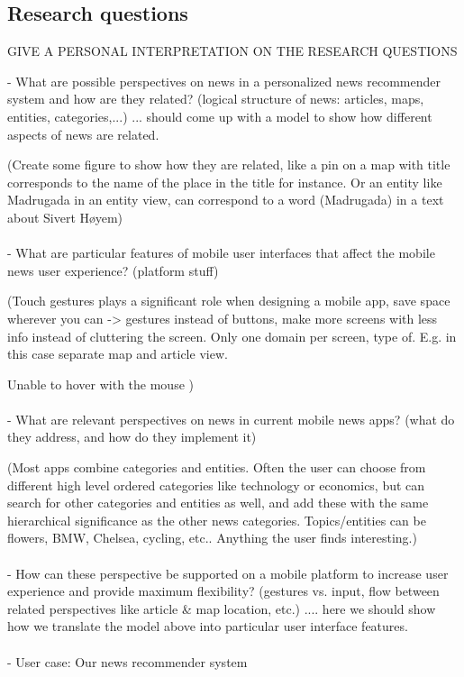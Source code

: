 \subsection{Research questions}

GIVE A PERSONAL INTERPRETATION ON THE RESEARCH QUESTIONS

- What are possible perspectives on news in a personalized news recommender system and how are they related? (logical structure of news: articles, maps, entities, categories,...)  ... should come up with a model to show how different aspects of news are related.

(Create some figure to show how they are related, like a pin on a map with title corresponds to the name of the place in the title for instance. Or an entity like Madrugada in an entity view, can correspond to a word (Madrugada) in a text about Sivert Høyem)
\\\\
- What are particular features of mobile user interfaces that affect the mobile news user experience? (platform stuff)

(Touch gestures plays a significant role when designing a mobile app, save space wherever you can -> gestures instead of buttons, make more screens with less info instead of cluttering the screen. Only one domain per screen, type of. E.g. in this case separate map and article view.

Unable to hover with the mouse
)
\\\\
- What are relevant perspectives on news in current mobile news apps? (what do they address, and how do they implement it)

(Most apps combine categories and entities. Often the user can choose from different high level ordered categories like technology or economics, but can search for other categories and entities as well, and add these with the same hierarchical significance as the other news categories. Topics/entities can be flowers, BMW, Chelsea, cycling, etc.. Anything the user finds interesting.)
\\\\
- How can these perspective be supported on a mobile platform to increase user experience and provide maximum flexibility? (gestures vs. input, flow between related perspectives like article \& map location, etc.)  .... here we should show how we translate the model above into particular user interface features.
\\\\
-  User case: Our news recommender system

